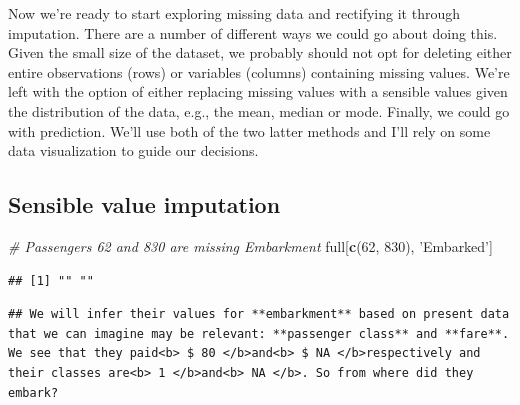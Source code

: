\documentclass[]{book}
\newenvironment{Shaded}{\begin{snugshade}}{\end{snugshade}}
\newcommand{\KeywordTok}[1]{\textcolor[rgb]{0.13,0.29,0.53}{\textbf{#1}}}
\newcommand{\DecValTok}[1]{\textcolor[rgb]{0.00,0.00,0.81}{#1}}
\newcommand{\StringTok}[1]{\textcolor[rgb]{0.31,0.60,0.02}{#1}}
\newcommand{\CommentTok}[1]{\textcolor[rgb]{0.56,0.35,0.01}{\textit{#1}}}
\newcommand{\NormalTok}[1]{#1}
\theoremstyle{definition}
\theoremstyle{definition}
\theoremstyle{definition}
\theoremstyle{remark}
\begin{document}
Now we're ready to start exploring missing data and rectifying it
through imputation. There are a number of different ways we could go
about doing this. Given the small size of the dataset, we probably
should not opt for deleting either entire observations (rows) or
variables (columns) containing missing values. We're left with the
option of either replacing missing values with a sensible values given
the distribution of the data, e.g., the mean, median or mode. Finally,
we could go with prediction. We'll use both of the two latter methods
and I'll rely on some data visualization to guide our decisions.

\subsection{Sensible value imputation}\label{sensible-value-imputation}

\begin{Shaded}
\begin{Highlighting}[]
\CommentTok{# Passengers 62 and 830 are missing Embarkment}
\NormalTok{full[}\KeywordTok{c}\NormalTok{(}\DecValTok{62}\NormalTok{, }\DecValTok{830}\NormalTok{), }\StringTok{'Embarked'}\NormalTok{]}
\end{Highlighting}
\end{Shaded}

\begin{verbatim}
## [1] "" ""
\end{verbatim}

\begin{verbatim}
## We will infer their values for **embarkment** based on present data that we can imagine may be relevant: **passenger class** and **fare**. We see that they paid<b> $ 80 </b>and<b> $ NA </b>respectively and their classes are<b> 1 </b>and<b> NA </b>. So from where did they embark?
\end{verbatim}
\end{document}

